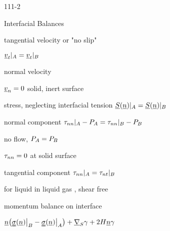 \begin{mitframe}{111-2}
    \begin{listone}
    	\item Interfacial Balances 
        \begin{listtwo}
			\item tangential velocity or "no slip"
            \begin{listthree}
				\item $\uline{\vvel}_{\timet}|_{\helmholtz}=\uline{\vvel}_{\timet}|_{\exergy}$
			\end{listthree}            
          \item normal velocity
            \begin{listthree}
            	\item $\uline{\vvel}_n=0$ solid, inert surface        
            \end{listthree}
          \item stress, neglecting interfacial tension $\uline{\entropy}(\uline{n})|_{\helmholtz}=\uline{\entropy}(\uline{n})|_{\exergy}$
          \begin{listthree}
          	\item normal component $\torque_{nn}|_{\helmholtz}-\p_{\helmholtz}=\torque_{nn}|_{\exergy}-\p_{\exergy}$
            	\begin{listfour}
                	\item no flow, $\p_{\helmholtz}=\p_{\exergy}$
                    \item $\torque_{nn}=0$ at solid surface
                \begin{listthree}
                		\item tangential component $\torque_{nn}|_{\helmholtz}=\torque_{n\timet}|_{\exergy}$
                	\begin{listfour}
                    		\item for liquid in liquid gas , shear free
                    \end{listfour}
                \end{listthree}
                \end{listfour}
          \end{listthree}
            \item momentum balance on interface
            	\begin{listthree}
                	\item $\uline{n}\big(\uuline{\molecrad}(\uline{n})\big|_{\exergy}-\uuline{\molecrad}(\uline{n})\big|_{\helmholtz}\big)+\gradop_{\entropy}\gamma+2\enthalpy\uline{n}\gamma$

\end{listthree}
\end{listtwo}
\end{listone}
\end{mitframe}
